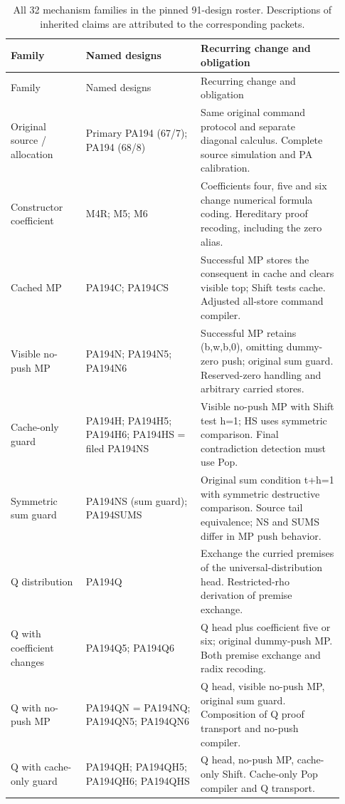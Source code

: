 \begingroup
\small
\setlength{\tabcolsep}{3pt}
\begin{longtable}{p{0.21\linewidth}p{0.32\linewidth}p{0.40\linewidth}}
\caption{All 32 mechanism families in the pinned 91-design roster. Descriptions of inherited claims are attributed to the corresponding packets.}\\
\toprule Family & Named designs & Recurring change and obligation\\\midrule\endfirsthead
\toprule Family & Named designs & Recurring change and obligation\\\midrule\endhead
\bottomrule\endfoot
Original source / allocation & Primary PA194 (67/7); PA194 (68/8) & Same original command protocol and separate diagonal calculus. Complete source simulation and PA calibration.\\[4pt]
Constructor coefficient & M4R; M5; M6 & Coefficients four, five and six change numerical formula coding. Hereditary proof recoding, including the zero alias.\\[4pt]
Cached MP & PA194C; PA194CS & Successful MP stores the consequent in cache and clears visible top; Shift tests cache. Adjusted all-store command compiler.\\[4pt]
Visible no-push MP & PA194N; PA194N5; PA194N6 & Successful MP retains (b,w,b,0), omitting dummy-zero push; original sum guard. Reserved-zero handling and arbitrary carried stores.\\[4pt]
Cache-only guard & PA194H; PA194H5; PA194H6; PA194HS = filed PA194NS & Visible no-push MP with Shift test h=1; HS uses symmetric comparison. Final contradiction detection must use Pop.\\[4pt]
Symmetric sum guard & PA194NS (sum guard); PA194SUMS & Original sum condition t+h=1 with symmetric destructive comparison. Source tail equivalence; NS and SUMS differ in MP push behavior.\\[4pt]
Q distribution & PA194Q & Exchange the curried premises of the universal-distribution head. Restricted-rho derivation of premise exchange.\\[4pt]
Q with coefficient changes & PA194Q5; PA194Q6 & Q head plus coefficient five or six; original dummy-push MP. Both premise exchange and radix recoding.\\[4pt]
Q with no-push MP & PA194QN = PA194NQ; PA194QN5; PA194QN6 & Q head, visible no-push MP, original sum guard. Composition of Q proof transport and no-push compiler.\\[4pt]
Q with cache-only guard & PA194QH; PA194QH5; PA194QH6; PA194QHS & Q head, no-push MP, cache-only Shift. Cache-only Pop compiler and Q transport.\\[4pt]

\end{longtable}
